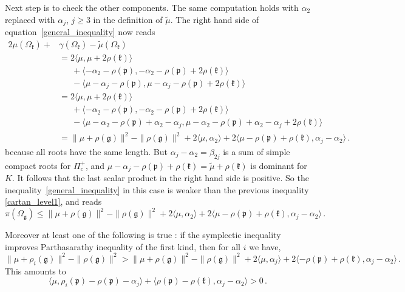 \documentclass{amsart}[draft,11pt]
\newcommand{\fg}{{\mathfrak{g}}}
\newcommand{\fk}{{\mathfrak{k}}}
\newcommand{\fp}{{\mathfrak{p}}}
\numberwithin{equation}{section}
\theoremstyle{definition}
\begin{document}
Next step is to check the other components.
The same computation holds with $\alpha_2$ replaced with $\alpha_j$, $j\geq 3$ in the definition of $\tilde{\mu}$.
The right hand side of equation~\eqref{general_inequality} now reads
\begin{align*}
    2\mu(\Omega_\fk)+
    &\gamma(\Omega_\fk)-\tilde{\mu}(\Omega_\fk) \\
    &=2\langle \mu,\mu+2\rho(\fk)\rangle \\
    &\phantom{2\langle\mu}+
    \langle -\alpha_2-\rho(\fp),
    -\alpha_2-\rho(\fp)+2\rho(\fk) \rangle \\
    &\phantom{2\langle\mu}-
    \langle \mu-\alpha_j-\rho(\fp),
    \mu-\alpha_j-\rho(\fp)+2\rho(\fk) \rangle \\
    &=2\langle \mu,\mu+2\rho(\fk)\rangle \\
    &\phantom{2\langle\mu}+
    \langle -\alpha_2-\rho(\fp),
    -\alpha_2-\rho(\fp)+2\rho(\fk) \rangle \\
    &\phantom{2\langle\mu}-
    \langle \mu-\alpha_2-\rho(\fp)+\alpha_2-\alpha_j,
    \mu-\alpha_2-\rho(\fp)+\alpha_2-\alpha_j+2\rho(\fk) \rangle \\
    &=\|\mu+\rho(\fg)\|^2-
    \|\rho(\fg)\|^2 
    +2\langle\mu,\alpha_2 \rangle 
    +2\langle \mu-\rho(\fp)+\rho(\fk),\alpha_j-\alpha_2\rangle \,.
\end{align*}
because all roots have the same length.
But $\alpha_j-\alpha_2=\beta_{2j}$ is a sum of simple compact roots for $\Pi^+_c$,
and $\mu-\alpha_j-\rho(\fp)+\rho(\fk)=\tilde{\mu}+\rho(\fk)$ is dominant for $K$.
It follows that the last scalar product in the right hand side is positive.
So the inequality~\eqref{general_inequality} in this case is weaker than the previous inequality
\eqref{cartan_level1}, and reads 
\begin{equation}
    \label{parthasympgeneral}
    \pi(\Omega_\fg) \leq 
    \|\mu+\rho(\fg)\|^2-
    \|\rho(\fg)\|^2 
    +2\langle\mu,\alpha_2 \rangle 
    +2\langle \mu-\rho(\fp)+\rho(\fk),\alpha_j-\alpha_2\rangle \,.
\end{equation}

Moreover at least one of the following is true : if the symplectic inequality improves Parthasarathy inequality of the first kind, then for all $i$ we have,
\begin{equation}
    \|\mu+\rho_i(\fg)\|^2-
    \|\rho(\fg)\|^2 >
    \|\mu+\rho(\fg)\|^2-
    \|\rho(\fg)\|^2 
    +2\langle\mu,\alpha_j \rangle 
    +2\langle -\rho(\fp)+\rho(\fk),\alpha_j-\alpha_2\rangle \,.
\end{equation}
This amounts to
\begin{equation}
    \langle 
    \mu ,
    \rho_i(\fp)-\rho(\fp)-\alpha_j
    \rangle 
    +
    \langle 
    \rho(\fp)-\rho(\fk),
    \alpha_j-\alpha_2
    \rangle >0 \,.
\end{equation}
\end{document}
